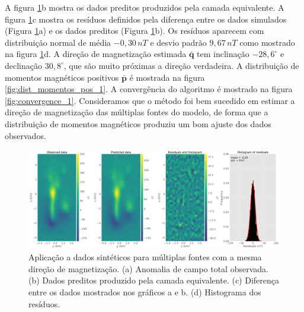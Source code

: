 A figura \ref{fig:data_fitting_1}b mostra os dados preditos produzidos pela camada equivalente. A figura \ref{fig:data_fitting_1}c mostra os resíduos definidos pela diferença entre os dados simulados (Figura \ref{fig:data_fitting_1}a) e os dados preditos (Figura \ref{fig:data_fitting_1}b). Os resíduos aparecem com distribuição normal de média $-0,30 \, nT$ e desvio padrão $9,67 \, nT$ como mostrado na figura \ref{fig:data_fitting_1}d. A direção de magnetização estimada $\bar{\mathbf{q}}$ tem inclinação $-28,6^\circ$ e declinação $30,8^\circ$, que são muito próximas a direção verdadeira. A distribuição de momentos magnéticos positivos $\bar{\mathbf{p}}$ é mostrada na figura \ref{fig:dist_momentos_pos_1}. A convergência do algoritmo é mostrado na figura \ref{fig:convergence_1}. Consideramos que o método foi bem sucedido em estimar a direção de magnetização das múltiplas fontes do modelo, de forma que a distribuição de momentos magnéticos produziu um bom ajuste dos dados observados. 

\begin{figure}
	\centering
	\includegraphics[width=1.1\textwidth]{Fig/eqlayer/unidir_test/data_fitting_LM_NNLS_magRM.png}
	\caption{Aplicação a dados sintéticos para múltiplas fontes com a mesma direção de magnetização. (a) Anomalia de campo total observada. (b) Dados preditos produzido pela camada equivalente. (c) Diferença entre os dados mostrados nos gráficos a e b. (d) Histograma dos resíduos.}
	\label{fig:data_fitting_1}
\end{figure}

